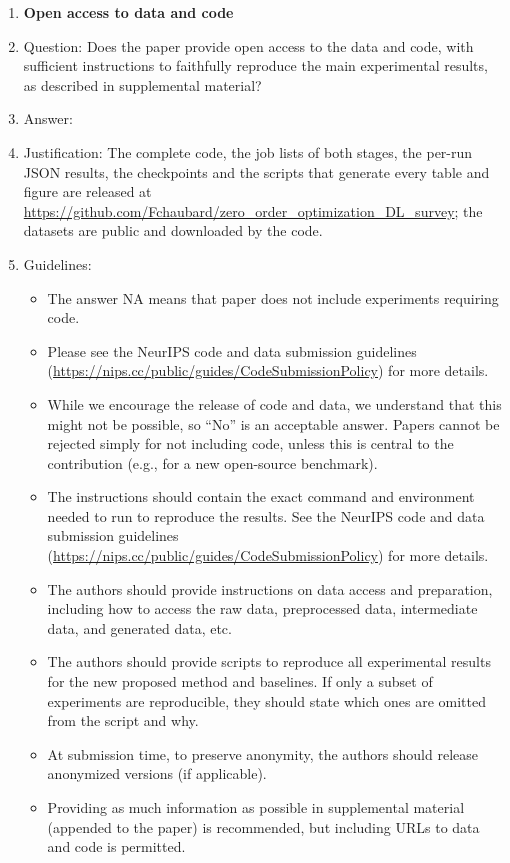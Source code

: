 \documentclass{article}
\begin{document}
\begin{enumerate}
\item {\bf Open access to data and code}
    \item[] Question: Does the paper provide open access to the data and code, with sufficient instructions to faithfully reproduce the main experimental results, as described in supplemental material?
    \item[] Answer: \answerYes{}
    \item[] Justification: The complete code, the job lists of both stages, the per-run JSON results, the checkpoints and the scripts that generate every table and figure are released at \url{https://github.com/Fchaubard/zero_order_optimization_DL_survey}; the datasets are public and downloaded by the code.
    \item[] Guidelines:
    \begin{itemize}
        \item The answer NA means that paper does not include experiments requiring code.
        \item Please see the NeurIPS code and data submission guidelines (\url{https://nips.cc/public/guides/CodeSubmissionPolicy}) for more details.
        \item While we encourage the release of code and data, we understand that this might not be possible, so “No” is an acceptable answer. Papers cannot be rejected simply for not including code, unless this is central to the contribution (e.g., for a new open-source benchmark).
        \item The instructions should contain the exact command and environment needed to run to reproduce the results. See the NeurIPS code and data submission guidelines (\url{https://nips.cc/public/guides/CodeSubmissionPolicy}) for more details.
        \item The authors should provide instructions on data access and preparation, including how to access the raw data, preprocessed data, intermediate data, and generated data, etc.
        \item The authors should provide scripts to reproduce all experimental results for the new proposed method and baselines. If only a subset of experiments are reproducible, they should state which ones are omitted from the script and why.
        \item At submission time, to preserve anonymity, the authors should release anonymized versions (if applicable).
        \item Providing as much information as possible in supplemental material (appended to the paper) is recommended, but including URLs to data and code is permitted.
    \end{itemize}



\end{enumerate}
\end{document}

